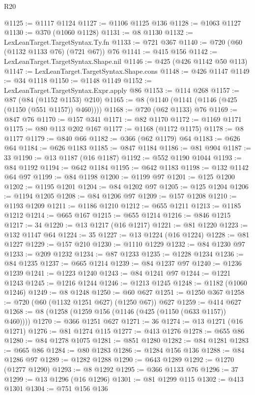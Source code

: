 \begin{lexlean}{R20}
\begin{coremodule}
@1125 := @1117 @1124
@1127 := @1106 @1125 @136
@1128 := @1063 @1127
@1130 := @370 (@1060 @1128)
@1131 := @8 @1130
@1132 := LexLeanTarget.TargetSyntax.Ty.fn
@1133 := @721 @367
@1140 := @720 (@60 (@1132 @1133 @76) (@721 @67)) @76
@1141 := @415 @156
@1142 := LexLeanTarget.TargetSyntax.Shape.nil
@1146 := @425 (@426 @1142 @50 @113)
@1147 := LexLeanTarget.TargetSyntax.Shape.cons
@1148 := @426 @1147
@1149 := @34 @1118
@1150 := @1148 @1149
@1152 := LexLeanTarget.TargetSyntax.Expr.apply @86
@1153 := @114 @268
@1157 := @87 (@84 (@1152 @1153) @210)
@1165 := @8 (@1140 (@1141 (@1146 (@425 (@1150 (@551 @1157)) @460))))
@1168 := @720 (@62 @1133) @76
@1169 := @847 @76
@1170 := @157 @341
@1171 := @82 @1170
@1172 := @1169 @1171
@1175 := @80 @113 @202 @167
@1177 := @1168 (@1172 @1175)
@1178 := @8 @1177
@1179 := @840 @66
@1182 := @366 (@62 @1179) @64
@1183 := @626 @64
@1184 := @626 @1183
@1185 := @847 @1184
@1186 := @81 @904
@1187 := 33
@1190 := @13 @1187 (@16 @1187)
@1192 := @552 @1190 @1044
@1193 := @84 @1192
@1194 := @642 @1184
@1195 := @642 @1183
@1198 := @132 @1142 @64 @97
@1199 := @84 @1198
@1200 := @1199 @97
@1201 := @125 @1200
@1202 := @1195 @1201
@1204 := @84 @1202 @97
@1205 := @125 @1204
@1206 := @1194 @1205
@1208 := @84 @1206 @97
@1209 := @157 @1208
@1210 := @1193 @1209
@1211 := @1186 @1210
@1212 := @655 @1211
@1213 := @1185 @1212
@1214 := @665 @167
@1215 := @655 @1214
@1216 := @846 @1215
@1217 := 34
@1220 := @13 @1217 (@16 @1217)
@1221 := @81 @1220
@1223 := @132 @1147 @64
@1224 := 35
@1227 := @13 @1224 (@16 @1224)
@1228 := @81 @1227
@1229 := @157 @210
@1230 := @1110 @1229
@1232 := @84 @1230 @97
@1233 := @209 @1232
@1234 := @87 @1233
@1235 := @1228 @1234
@1236 := @84 @1235
@1237 := @665 @1214
@1239 := @84 @1237 @97
@1240 := @1236 @1239
@1241 := @1223 @1240
@1243 := @84 @1241 @97
@1244 := @1221 @1243
@1245 := @1216 @1244
@1246 := @1213 @1245
@1248 := @1182 (@1060 @1246)
@1249 := @8 @1248
@1250 := @60 @627
@1251 := @1250 @367
@1258 := @720 (@60 (@1132 @1251 @627) (@1250 @67)) @627
@1259 := @414 @627
@1268 := @8 (@1258 (@1259 @156 (@1146 (@425 (@1150 (@633 @1157)) @460))))
@1270 := @366 @1251 @627
@1271 := 36
@1274 := @13 @1271 (@16 @1271)
@1276 := @81 @1274 @115
@1277 := @413 @1276
@1278 := @655 @86
@1280 := @84 @1278 @1075
@1281 := @851 @1280
@1282 := @84 @1281
@1283 := @665 @86
@1284 := @80 @1283
@1286 := @1284 @156 @136
@1288 := @84 @1286 @97
@1289 := @1282 @1288
@1290 := @643 @1289
@1292 := @1270 (@1277 @1290)
@1293 := @8 @1292
@1295 := @366 @1133 @76
@1296 := 37
@1299 := @13 @1296 (@16 @1296)
@1301 := @81 @1299 @115
@1302 := @413 @1301
@1304 := @751 @156 @136

\end{coremodule}
\end{lexlean}
